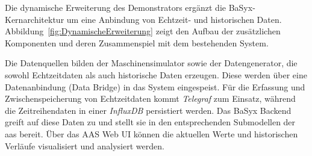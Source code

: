 Die dynamische Erweiterung des Demonstrators ergänzt die BaSyx-Kernarchitektur um eine Anbindung von Echtzeit- und historischen Daten. 
Abbildung~\ref{fig:DynamischeErweiterung} zeigt den Aufbau der zusätzlichen Komponenten und deren Zusammenspiel mit dem bestehenden System.

Die Datenquellen bilden der Maschinensimulator sowie der Datengenerator, die sowohl Echtzeitdaten als auch historische Daten erzeugen. 
Diese werden über eine Datenanbindung (Data Bridge) in das System eingespeist. 
Für die Erfassung und Zwischenspeicherung von Echtzeitdaten kommt \textit{Telegraf} zum Einsatz, während die Zeitreihendaten in einer \textit{InfluxDB} persistiert werden. 
Das BaSyx Backend greift auf diese Daten zu und stellt sie in den entsprechenden Submodellen der \acs{aas} bereit. 
Über das AAS Web UI können die aktuellen Werte und historischen Verläufe visualisiert und analysiert werden.





